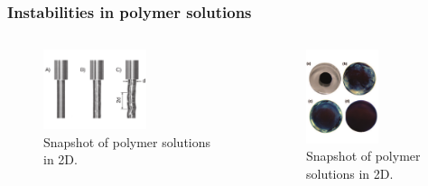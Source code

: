 \begin{frame}
  \frametitle{Instabilities in polymer solutions}
  \begin{columns}
    \begin{column}{0.5\textwidth}
      \begin{figure}[t]
        \centering
        \includegraphics[width=0.6\textwidth]{img/melt.pdf}
        \caption{Snapshot of polymer solutions in 2D.}
        \label{fig:snap}
      \end{figure}
    \end{column}
    \begin{column}{0.5\textwidth}
      \begin{figure}[t]
        \centering
        \includegraphics[width=0.6\textwidth]{img/mix2.pdf}
        \caption{Snapshot of polymer solutions in 2D.}
        \label{fig:snap}
      \end{figure}
    \end{column}
  \end{columns}
\end{frame}

